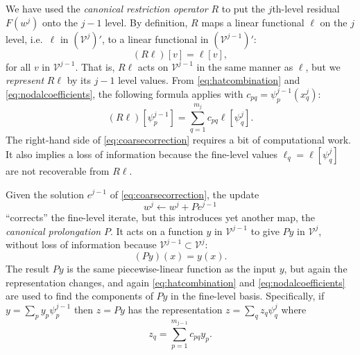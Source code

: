\documentclass[letterpaper,final,12pt,reqno]{amsart}
\theoremstyle{claim}
\numberwithin{equation}{section}
\numberwithin{figure}{section}
\numberwithin{table}{section}
\numberwithin{theorem}{section}
\begin{document}
We have used the \emph{canonical restriction operator} $R$ to put the $j$th-level residual $F(w^j)$ onto the $j-1$ level.  By definition, $R$ maps a linear functional $\ell$ on the $j$ level, i.e.~$\ell$ in $(\mathcal{V}^j)'$, to a linear functional in $(\mathcal{V}^{j-1})'$:
\begin{equation}
  (R \ell)[v] = \ell[v], \label{eq:canonicalrestriction}
\end{equation}
for all $v$ in $\mathcal{V}^{j-1}$.  That is, $R \ell$ acts on $\mathcal{V}^{j-1}$ in the same manner as $\ell$, but we \emph{represent} $R\ell$ by its $j-1$ level values.  From \eqref{eq:hatcombination} and \eqref{eq:nodalcoefficients}, the following formula applies with $c_{pq}=\psi_p^{j-1}(x_q^j)$:
\begin{equation}
  (R \ell)[\psi_p^{j-1}] = \sum_{q=1}^{m_j} c_{pq} \ell[\psi_q^j].  \label{eq:canonicalrestrictionaction}
\end{equation}
The right-hand side of \eqref{eq:coarsecorrection} requires a bit of computational work.  It also implies a loss of information because the fine-level values $\ell_q=\ell[\psi_q^j]$ are not recoverable from $R\ell$.

Given the solution $e^{j-1}$ of \eqref{eq:coarsecorrection}, the update
\begin{equation}
  w^j \gets w^j + P e^{j-1}  \label{eq:update}
\end{equation}
``corrects'' the fine-level iterate, but this introduces yet another map, the \emph{canonical prolongation} $P$.  It acts on a function $y$ in $\mathcal{V}^{j-1}$ to give $Py$ in $\mathcal{V}^j$, without loss of information because $\mathcal{V}^{j-1} \subset \mathcal{V}^j$:
\begin{equation}
  (P y)(x) = y(x). \label{eq:canonicalprolongation}
\end{equation}
The result $P y$ is the same piecewise-linear function as the input $y$, but again the representation changes, and again \eqref{eq:hatcombination} and \eqref{eq:nodalcoefficients} are used to find the components of $Py$ in the fine-level basis.  Specifically, if $y=\sum_p y_p \psi_p^{j-1}$ then $z=Py$ has the representation $z = \sum_q z_q \psi_q^j$ where
\begin{equation}
  z_q = \sum_{p=1}^{m_{j-1}} c_{pq} y_p. \label{eq:canonicalprolongationaction}
\end{equation}
\end{document}
